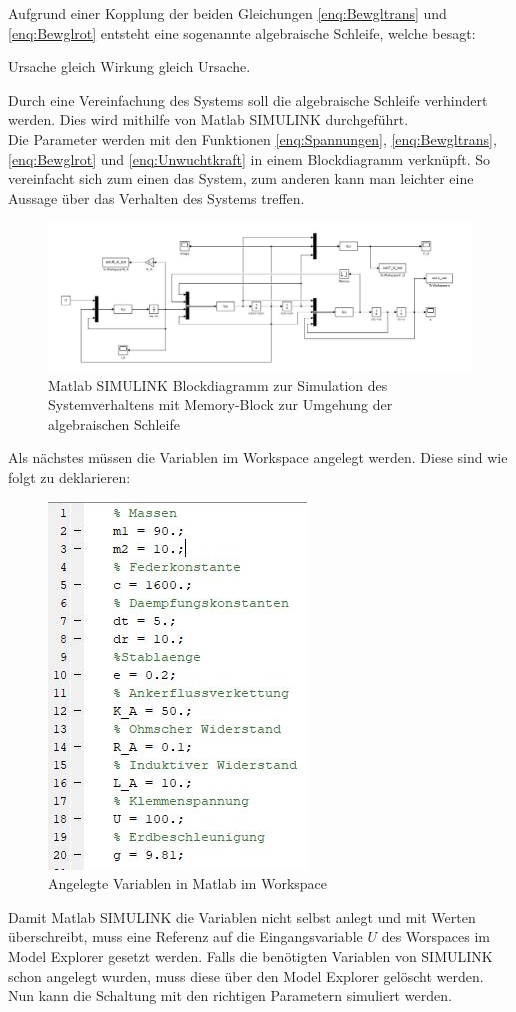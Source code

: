 Aufgrund einer Kopplung der beiden Gleichungen \ref{enq:Bewgltrans} und \ref{enq:Bewglrot} entsteht eine sogenannte algebraische Schleife, welche besagt:

\begin{center}
	Ursache gleich Wirkung gleich Ursache. \cite[S. 64]{HelmutBode.}
\end{center}

Durch eine Vereinfachung des Systems soll die algebraische Schleife verhindert werden. Dies wird mithilfe von Matlab SIMULINK durchgeführt. \\
Die Parameter werden mit den Funktionen \ref{enq:Spannungen}, \ref{enq:Bewgltrans}, \ref{enq:Bewglrot} und \ref{enq:Unwuchtkraft} in einem Blockdiagramm verknüpft. So vereinfacht sich zum einen das System, zum anderen kann man leichter eine Aussage über das Verhalten des Systems treffen.

\begin{figure}[hbt]
	\centering
	\includegraphics[width=1\linewidth]{Images/ProjektB_Elektrik_Blockdiagramm}
	\caption{Matlab SIMULINK Blockdiagramm zur Simulation des Systemverhaltens mit Memory-Block zur Umgehung der algebraischen Schleife}
	\label{fig:Blockdiagramm}
\end{figure}

\newpage

Als nächstes müssen die Variablen im Workspace angelegt werden. Diese sind wie folgt zu deklarieren: \\

\begin{figure}[hbt]
	\centering
	\includegraphics[width=0.3\linewidth]{Images/Variablen}
	\caption{Angelegte Variablen in Matlab im Workspace}
	\label{fig:Variablen}
\end{figure}

Damit Matlab SIMULINK die Variablen nicht selbst anlegt und mit Werten überschreibt, muss eine Referenz auf die Eingangsvariable $U$ des Worspaces im Model Explorer gesetzt werden. Falls die benötigten Variablen von SIMULINK schon angelegt wurden, muss diese über den Model Explorer gelöscht werden. Nun kann die Schaltung mit den richtigen Parametern simuliert werden.